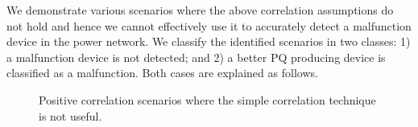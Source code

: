 We demonstrate various scenarios where the above correlation assumptions do not hold and hence we cannot effectively use it to accurately detect a malfunction device in the power network. We classify the identified scenarios in two classes: 1) a malfunction device is not detected; and 2) a better PQ producing device is classified as a malfunction. Both cases are explained as follows.

\begin{figure}[!p]
\centering
{}

\vspace{1cm}

\vspace{0.5cm}
\caption{Positive correlation scenarios where the simple correlation technique is not useful.} 
\vspace{1cm}
\label{correlationAnalysisPositive}
\end{figure}


